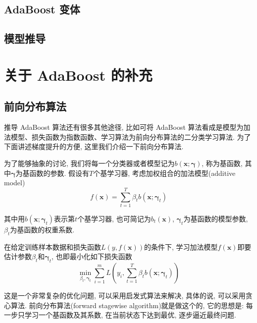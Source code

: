 \documentclass[a4paper,UTF8]{ctexart}
\theoremstyle{plain} \newtheorem{theorem}{定理}[section]
\theoremstyle{plain} \newtheorem{definition}{定义}[section]
\theoremstyle{plain} \newtheorem{lemma}{引理}[section]
\theoremstyle{plain} \newtheorem{proposition}{命题}[section]
\theoremstyle{plain} \newtheorem{example}{例}[section]
\theoremstyle{plain} \newtheorem{remark}{注}[section]
\theoremstyle{plain} \newtheorem{corollary}{推论}[section]
\begin{document}
\subsection{AdaBoost 变体}



\subsection{模型推导}


\section{关于 AdaBoost 的补充}
\subsection{前向分布算法}
推导 AdaBoost 算法还有很多其他途径, 比如可将 AdaBoost 算法看成是模型为加法模型、损失函数为指数函数、学习算法为前向分布算法的二分类学习算法. 为了下面讲述梯度提升的方便, 这里我们介绍一下前向分布算法.

为了能够抽象的讨论, 我们将每一个分类器或者模型记为$b(\bm{x}; \bm{\gamma})$, 称为基函数, 其中$\bm{\gamma}$为基函数的参数. 假设有$T$个基学习器, 考虑加权组合的加法模型(additive model)
\begin{equation*}
f(\bm{x}) = \sum_{t=1}^{T} \beta_{t} b(\bm{x}; \bm{\gamma}_{t})
\end{equation*}

其中用$b(\bm{x}; \bm{\gamma}_{t})$表示第$t$个基学习器, 也可简记为$b_{t}(\bm{x})$, $\bm{\gamma}_{t}$为基函数的模型参数, $\beta_{t}$为基函数的权重系数.

在给定训练样本数据和损失函数$L(y, f(\bm{x}))$的条件下, 学习加法模型$f(\bm{x})$即要估计参数$\beta_{t}$和$\bm{\gamma}_{t}$, 也即最小化如下损失函数
\begin{equation*}
\min_{\beta_{t}, \bm{\gamma}_{t}} \sum_{i=1}^{m} L \left( y_{i}, \sum_{t=1}^{T} \beta_{t} b(\bm{x}; \bm{\gamma}_{t}) \right)
\end{equation*}

这是一个非常复杂的优化问题, 可以采用启发式算法来解决, 具体的说, 可以采用贪心算法. 前向分布算法(forward stagewise algorithm)就是做这个的, 它的思想是: 每一步只学习一个基函数及其系数, 在当前状态下达到最优, 逐步逼近最终问题.
\end{document}
